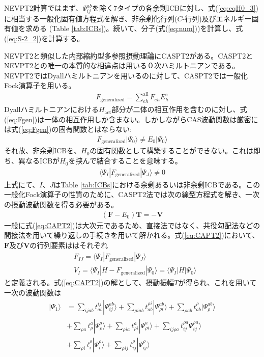 \documentclass[11pt,pra,aps]{revtex4}
\begin{document}
NEVPT2計算ではまず、$\Psi_{ij}^{ab}$を除く7タイプの各余剰ICBに対し、式(\ref{eq:eqH0_3})に相当する一般化固有値方程式を解き、非余剰化行列($C$-行列)及びエネルギー固有値を求める (Table \ref{tab:ICBs})。続いて、分子(式(\ref{eq:num}))を計算し、式(\ref{eq:S-2_2})を計算する。

NEVPT2と類似した内部縮約型多参照摂動理論にCASPT2がある。CASPT2とNEVPT2との唯一の本質的な相違点は用いる０次ハミルトニアンである。NEVPT2ではDyallハミルトニアンを用いるのに対して、CASPT2では一般化Fock演算子を用いる。
\begin{align}
  F_\text{generalized}=\sum_{eh}^\text{all} F_{eh} E^e_h \label{eq:Fgen}
\end{align}
Dyallハミルトニアンにおける$H_\text{act}$部分が二体の相互作用を含むのに対し、式(\ref{eq:Fgen})は一体の相互作用しか含まない。しかしながらCAS波動関数は厳密には式(\ref{eq:Fgen})の固有関数とはならない:
\begin{align}
  F_\text{generalized}|\Psi_0\rangle \neq E_0|\Psi_0\rangle \label{eq:Fgen-eig}
\end{align}
それ故、非余剰ICBを、$H_0$の固有関数として構築することができない。これは即ち、異なるICBが$H_0$を挟んで結合することを意味する。
\begin{align}
  \langle \Psi_I|F_\text{generalized}|\Psi_J\rangle\neq0 \label{eq:coupling}
\end{align}
上式にて、$I$、$J$はTable \ref{tab:ICBs}における余剰あるいは非余剰ICBである。この一般化Fock演算子の性質のために、CASPT2法では次の線型方程式を解き、一次の摂動波動関数を得る必要がある。
\begin{align}
  \left(\mathbf{F}-E_0\right)\mathbf{T}=-\mathbf{V} \label{eq:CAPT2}
\end{align}
一般に式(\ref{eq:CAPT2})は大次元であるため、直接法ではなく、共役勾配法などの間接法を用いて繰り返しの手続きを用いて解かれる。式(\ref{eq:CAPT2})において、$\mathbf{F}$及び$\mathbf{V}$の行列要素ははそれぞれ
\begin{align}
  &F_{IJ}=\langle\Psi_I|F_\text{generalized}|\Psi_J\rangle \label{eq:fij} \\
  &V_{I} =\langle\Psi_I|H-F_\text{generalized}|\Psi_0\rangle = \langle\Psi_I|H|\Psi_0\rangle
\end{align}
と定義される。式(\ref{eq:CAPT2})の解として、摂動振幅$T$が得られ、これを用いて一次の波動関数は
\begin{align}
  |\Psi_1\rangle&=\sum_{ijab} t_{ab}^{ij} |\Psi_{ij}^{ab}\rangle+\sum_{\rho iab} t_{ab}^{\rho i} |\Psi_{\rho i}^{ab}\rangle+\sum_{\rho ab} t_{ab}^{\rho} |\Psi_{\rho}^{ab}\rangle \nonumber \\
  &+\sum_{\rho a} t_{\rho}^a |\Psi_{\rho}^{a}\rangle +\sum_{\rho ia} t_{\rho i}^a |\Psi_{\rho i}^{a}\rangle + \sum_{ij\rho a} t_{ij}^{\rho a} \Psi_{ij}^{\rho a}\rangle \nonumber \\
  &+\sum_{\rho i} t_i^{\rho} |\Psi_i^{\rho}\rangle+\sum_{\rho ij} t_{ij}^{\rho} |\Psi_{ij}^{\rho}\rangle
\end{align}
\end{document}
